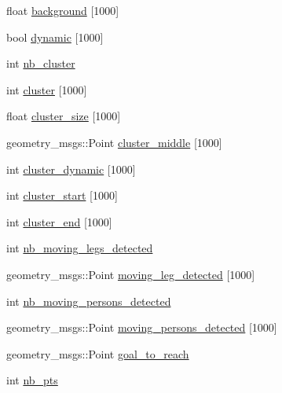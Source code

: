 \begin{DoxyCompactItemize}
\item 
float \hyperlink{classmoving__persons__detector_ab6c082d9a769d1065f400e449320c3ad}{background} \mbox{[}1000\mbox{]}
\item 
bool \hyperlink{classmoving__persons__detector_a32f205edd674741153028305da0103a2}{dynamic} \mbox{[}1000\mbox{]}
\item 
int \hyperlink{classmoving__persons__detector_a62bb0f7e285afa97978df71473259d58}{nb\+\_\+cluster}
\item 
int \hyperlink{classmoving__persons__detector_a8453207bfdcffd1e45ab9dcc73210e60}{cluster} \mbox{[}1000\mbox{]}
\item 
float \hyperlink{classmoving__persons__detector_ace70d87779974b46c12273865b36ccf1}{cluster\+\_\+size} \mbox{[}1000\mbox{]}
\item 
geometry\+\_\+msgs\+::\+Point \hyperlink{classmoving__persons__detector_a4a961028d83e2d74b5af1e53593be67c}{cluster\+\_\+middle} \mbox{[}1000\mbox{]}
\item 
int \hyperlink{classmoving__persons__detector_a729d1bcf6929766ce3a6e6f5fe0a56d1}{cluster\+\_\+dynamic} \mbox{[}1000\mbox{]}
\item 
int \hyperlink{classmoving__persons__detector_aa8bb9b30e452cb90530b96328f07d54a}{cluster\+\_\+start} \mbox{[}1000\mbox{]}
\item 
int \hyperlink{classmoving__persons__detector_a0d32b0ae38b8f9b26c007faabafe7450}{cluster\+\_\+end} \mbox{[}1000\mbox{]}
\item 
int \hyperlink{classmoving__persons__detector_aee7e42a55781f7c7297c7355296c6666}{nb\+\_\+moving\+\_\+legs\+\_\+detected}
\item 
geometry\+\_\+msgs\+::\+Point \hyperlink{classmoving__persons__detector_a412141d71e00568c403f083c9c7b5410}{moving\+\_\+leg\+\_\+detected} \mbox{[}1000\mbox{]}
\item 
int \hyperlink{classmoving__persons__detector_a7f2bae601889ce3c935ae218814e6be9}{nb\+\_\+moving\+\_\+persons\+\_\+detected}
\item 
geometry\+\_\+msgs\+::\+Point \hyperlink{classmoving__persons__detector_a20d0b31be1b975603b3967e8de6da662}{moving\+\_\+persons\+\_\+detected} \mbox{[}1000\mbox{]}
\item 
geometry\+\_\+msgs\+::\+Point \hyperlink{classmoving__persons__detector_af718cc27ac29e0ca034fbafe542cf23c}{goal\+\_\+to\+\_\+reach}
\item 
int \hyperlink{classmoving__persons__detector_a207858cf1fc0675c38eb41a5d8edf245}{nb\+\_\+pts}
\item 

\end{DoxyCompactItemize}
